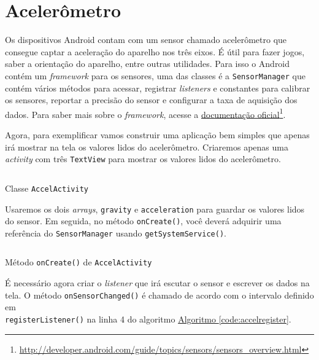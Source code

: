 \documentclass[a4paper,12pt,brazil,oneside]{book}
\begin{document}
\chapter{Acelerômetro}
	Os dispositivos Android contam com um sensor chamado acelerômetro que consegue captar a aceleração do aparelho nos três eixos. É útil para fazer jogos, saber a orientação do aparelho, entre outras utilidades. Para isso o Android contém um \emph{framework} para os sensores, uma das classes é a \texttt{SensorManager} que contém vários métodos para acessar, registrar \emph{listeners} e constantes para calibrar os sensores, reportar a precisão do sensor e configurar a taxa de aquisição dos dados. Para saber mais sobre o \emph{framework}, acesse a \href{http://developer.android.com/guide/topics/sensors/sensors\_overview.html}{documentação oficial}\footnote{\href{http://developer.android.com/guide/topics/sensors/sensors\_overview.html}{http://developer.android.com/guide/topics/sensors/sensors\_overview.html}}.

	Agora, para exemplificar vamos construir uma aplicação bem simples que apenas irá mostrar na tela os valores lidos do acelerômetro. Criaremos apenas uma \emph{activity} com três \texttt{TextView} para mostrar os valores lidos do acelerômetro.

	\begin{listing}[H]
	\inputminted[linenos=true,fontsize=\small,frame=lines, framesep=2mm, tabsize=2,numbersep=5pt]{java}{src/api/accelerometer/activity.java}
	\caption{Classe \texttt{AccelActivity}}
	\label{code:accelactivity}
	\end{listing} 			

	Usaremos os dois \emph{arrays}, \texttt{gravity} e \texttt{acceleration} para guardar os valores lidos do sensor. Em seguida, no método \texttt{onCreate()}, você deverá adquirir uma referência do \texttt{SensorManager} usando \texttt{getSystemService()}.

	\begin{listing}[H]
	\inputminted[linenos=true,fontsize=\small,frame=lines, framesep=2mm, tabsize=2,numbersep=5pt]{java}{src/api/accelerometer/oncreate.java}
	\caption{Método \texttt{onCreate()} de \texttt{AccelActivity}}
	\label{code:accelactivitycreate}
	\end{listing} 			

	É necessário agora criar o \emph{listener} que irá escutar o sensor e escrever os dados na tela. O método \texttt{onSensorChanged()} é chamado de acordo com o intervalo definido em \\ \texttt{registerListener()} na linha 4 do algoritmo \hyperref[code:accelregister]{Algoritmo \ref*{code:accelregister}}.
\end{document}
